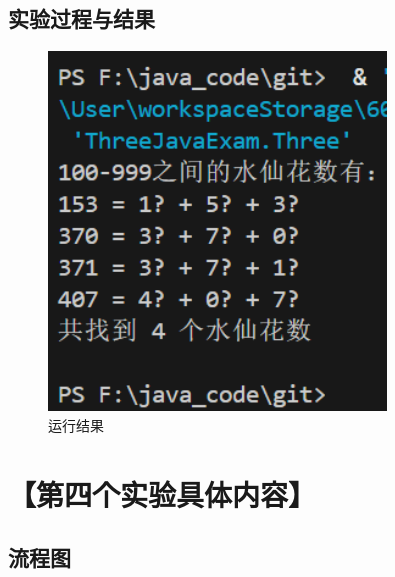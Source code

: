 \documentclass[12pt,a4paper]{article}
\begin{document}
\subsection*{实验过程与结果}

\begin{figure}[H]
\centering
\includegraphics[width=0.8\textwidth]{three.png}
\caption{运行结果}
\end{figure}

\section*{【第四个实验具体内容】}
\subsection*{流程图}
\end{document}
